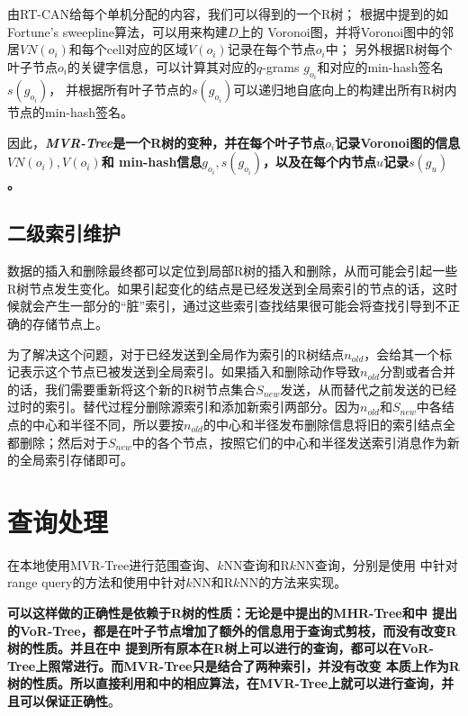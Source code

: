 \documentclass{ML}
\begin{document}
由RT-CAN给每个单机分配的内容，我们可以得到的一个R树；%
根据\cite{VD-Property}中提到的如Fortune's sweepline算法，可以用来构建$D$上的
Voronoi图，并将Voronoi图中的邻居$VN(o_i)$和每个cell对应的区域$V(o_i)$记录在每个节点$o_i$中；
另外根据R树每个叶子节点$o_i$的关键字信息，可以计算其对应的$q$-grams $g_{o_i}$和对应的min-hash签名$s(g_{o_i})$，
并根据所有叶子节点的$s(g_{o_i})$可以递归地自底向上的构建出所有R树内节点的min-hash签名\cite{MHR-Tree}。

因此，\textbf{\textit{MVR-Tree}是一个R树的变种，并在每个叶子节点$o_i$记录Voronoi图的信息$VN(o_i), V(o_i)$和
min-hash信息$g_{o_i}, s(g_{o_i})$，以及在每个内节点$u$记录$s(g_u)$。}

\subsection{二级索引维护}
数据的插入和删除最终都可以定位到局部R树的插入和删除，从而可能会引起一些R树节点发生变化。如果引起变化的结点是已经发送到全局索引的节点的话，这时候就会产生一部分的“脏”索引，通过这些索引查找结果很可能会将查找引导到不正确的存储节点上。

为了解决这个问题，对于已经发送到全局作为索引的R树结点$n_{old}$，会给其一个标记表示这个节点已被发送到全局索引。如果插入和删除动作导致$n_{old}$分割或者合并的话，我们需要重新将这个新的R树节点集合$S_{new}$发送，从而替代之前发送的已经
过时的索引。替代过程分删除源索引和添加新索引两部分。因为$n_{old}$和$S_{new}$中各结点的中心和半径不同，所以要按$n_{old}$的中心和半径发布删除信息将旧的索引结点全都删除；然后对于$S_{new}$中的各个节点，按照它们的中心和半径发送索引消息作为新的全局索引存储即可。
\section{查询处理}
在本地使用MVR-Tree进行范围查询、$k$NN查询和R$k$NN查询，分别是使用\cite{MHR-Tree}
中针对range query的方法和使用\cite{VoR-Tree}中针对$k$NN和R$k$NN的方法来实现。

\textbf{可以这样做的正确性是依赖于R树的性质：无论是\cite{MHR-Tree}中提出的MHR-Tree和\cite{VoR-Tree}中
提出的VoR-Tree，都是在叶子节点增加了额外的信息用于查询式剪枝，而没有改变R树的性质。并且在\cite{VoR-Tree}中
提到所有原本在R树上可以进行的查询，都可以在VoR-Tree上照常进行。而MVR-Tree只是结合了两种索引，并没有改变
本质上作为R树的性质。所以直接利用\cite{MHR-Tree}和\cite{VoR-Tree}中的相应算法，在MVR-Tree上就可以进行查询，并且可以保证正确性}。
\end{document}
